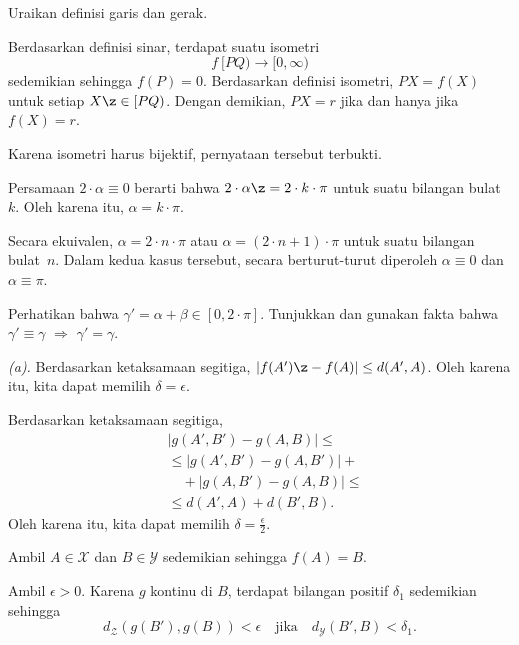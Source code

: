 Uraikan definisi garis dan gerak.

Berdasarkan definisi sinar,
terdapat suatu isometri
$$f\:[P Q)\to [0,\infty)$$
sedemikian sehingga $f(P)=0$.
Berdasarkan definisi isometri, $P X=f(X)$ untuk setiap $X\z\in [P Q)$.
Dengan demikian, $P X=r$ jika dan hanya jika $f(X)=r$.

Karena isometri harus bijektif, pernyataan tersebut terbukti.




Persamaan
$2\cdot\alpha\equiv 0$
berarti bahwa $2\cdot\alpha\z=2\cdot k\cdot\pi$ untuk suatu bilangan bulat~$k$.
Oleh karena itu,
$\alpha=k\cdot\pi$.

Secara ekuivalen, $\alpha=2\cdot n\cdot \pi$ atau $\alpha=(2\cdot n+1)\cdot \pi$ untuk suatu bilangan bulat~$n$.
Dalam kedua kasus tersebut, secara berturut-turut diperoleh $\alpha\equiv 0$ dan $\alpha\equiv \pi$.

Perhatikan bahwa $\gamma'=\alpha+\beta\in [0,2\cdot \pi]$.
Tunjukkan dan gunakan fakta bahwa $\gamma'\equiv\gamma$ $\Rightarrow$ $\gamma'=\gamma$.

 \textit{(a).}
Berdasarkan ketaksamaan segitiga,
$|f(A')\z-f(A)|\le d(A',A)$.
Oleh karena itu, kita dapat memilih $\delta=\epsilon$.

Berdasarkan ketaksamaan segitiga,
\begin{align*}
&|g(A',B')-g(A,B)|
\le 
\\
&\le|g(A',B')-g(A,B')|+
\\
&\quad+
|g(A,B')-g(A,B)|\le
\\
&\le d(A',A)+d(B',B).
\end{align*}
Oleh karena itu, kita dapat memilih $\delta=\tfrac\epsilon2$.

Ambil $A\in \mathcal{X}$ dan $B\in\mathcal{Y}$
sedemikian sehingga $f(A)=B$.

Ambil $\epsilon>0$.
Karena $g$ kontinu di $B$, terdapat bilangan positif $\delta_1$ sedemikian sehingga 
$$d_{\mathcal{Z}}(g(B'),g(B))<\epsilon
\quad
\text{jika}
\quad
d_{\mathcal{Y}}(B',B)<\delta_1.$$ 

